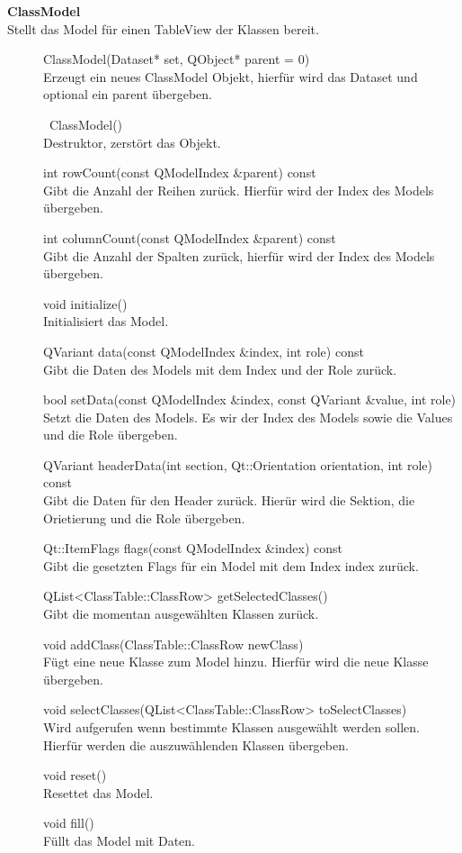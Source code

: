 \textbf{ClassModel}\\
Stellt das Model für einen TableView der Klassen bereit.
\begin{description}
	\item[ ] ClassModel(Dataset* set, QObject* parent = 0) \\
	Erzeugt ein neues ClassModel Objekt, hierfür wird das Dataset und optional ein parent übergeben.
  	\item[ ] ~ClassModel() \\	
	Destruktor, zerstört das Objekt.
  	\item[ ] int rowCount(const QModelIndex \&parent) const \\
	Gibt die Anzahl der Reihen zurück. Hierfür wird der Index des Models übergeben.
  	\item[ ] int columnCount(const QModelIndex \&parent) const \\
	Gibt die Anzahl der Spalten zurück, hierfür wird der Index des Models übergeben.
  	\item[ ] void initialize() \\
	Initialisiert das Model.
  	\item[ ] QVariant data(const QModelIndex \&index, int role) const \\
	Gibt die Daten des Models mit dem Index und der Role zurück.
 	\item[ ] bool setData(const QModelIndex \&index, const QVariant \&value, int role) \\
	Setzt die Daten des Models. Es wir der Index des Models sowie die Values und die Role übergeben.
 	\item[ ] QVariant headerData(int section, Qt::Orientation orientation, int role) const \\
	Gibt die Daten für den Header zurück. Hierür wird die Sektion, die Orietierung und die Role übergeben.
  	\item[ ] Qt::ItemFlags flags(const QModelIndex \&index) const \\
	Gibt die gesetzten Flags für ein Model mit dem Index index zurück.
  	\item[ ] QList<ClassTable::ClassRow> getSelectedClasses() \\
	Gibt die momentan ausgewählten Klassen zurück.
  	\item[ ] void addClass(ClassTable::ClassRow newClass) \\
	Fügt eine neue Klasse zum Model hinzu. Hierfür wird die neue Klasse übergeben.
  	\item[ ] void selectClasses(QList<ClassTable::ClassRow> toSelectClasses) \\
	Wird aufgerufen wenn bestimmte Klassen ausgewählt werden sollen. Hierfür werden die auszuwählenden Klassen übergeben.
  	\item[ ] void reset() \\
	Resettet das Model.
  	\item[ ] void fill() \\
	Füllt das Model mit Daten.
\end{description}

